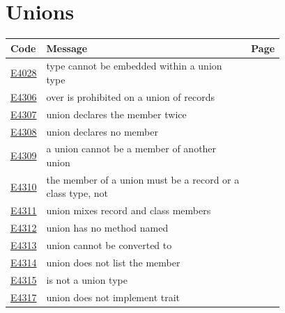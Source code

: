
\clearpage
\section{Unions}
\label{sec:codes:unions}

\begin{longtable}{@{}l p{0.78\linewidth} r@{}}
\toprule Code & Message & Page\\ \midrule \endhead
\hyperref[sec:codes:e4028]{E4028} & type \errhole{} cannot be embedded within a union type & \pageref{sec:codes:e4028}\\
\hyperref[sec:codes:e4306]{E4306} & over is prohibited on a union of records & \pageref{sec:codes:e4306}\\
\hyperref[sec:codes:e4307]{E4307} & union \errhole{} declares the member \errhole{} twice & \pageref{sec:codes:e4307}\\
\hyperref[sec:codes:e4308]{E4308} & union \errhole{} declares no member & \pageref{sec:codes:e4308}\\
\hyperref[sec:codes:e4309]{E4309} & a union cannot be a member of another union & \pageref{sec:codes:e4309}\\
\hyperref[sec:codes:e4310]{E4310} & the member of a union must be a record or a class type, not \errhole{} & \pageref{sec:codes:e4310}\\
\hyperref[sec:codes:e4311]{E4311} & union \errhole{} mixes record and class members & \pageref{sec:codes:e4311}\\
\hyperref[sec:codes:e4312]{E4312} & union \errhole{} has no method named \errhole{} & \pageref{sec:codes:e4312}\\
\hyperref[sec:codes:e4313]{E4313} & union \errhole{} cannot be converted to \errhole{} & \pageref{sec:codes:e4313}\\
\hyperref[sec:codes:e4314]{E4314} & union \errhole{} does not list the member \errhole{} & \pageref{sec:codes:e4314}\\
\hyperref[sec:codes:e4315]{E4315} & \errhole{} is not a union type & \pageref{sec:codes:e4315}\\
\hyperref[sec:codes:e4317]{E4317} & union \errhole{} does not implement trait \errhole{} & \pageref{sec:codes:e4317}\\
\bottomrule
\end{longtable}

\label{sec:codes:e4028}

